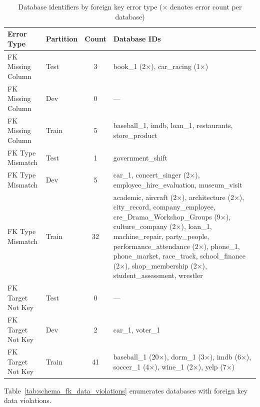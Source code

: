 \documentclass[]{einformatica}
\begin{document}
\begin{table}[ht]
    \caption{Database identifiers by foreign key error type (× denotes error count per database)}
    \label{tab:schema_dbs_by_error}
    \centering
    \footnotesize
    \begin{tabular}{llcp{}}
        \toprule
        \textbf{Error Type} & \textbf{Partition} & \textbf{Count} & \textbf{Database IDs} \\
        \midrule
        FK Missing Column & Test & 3 & book\_1 (2×), car\_racing (1×) \\
        FK Missing Column & Dev & 0 & --- \\
        FK Missing Column & Train & 5 & baseball\_1, imdb, loan\_1, restaurants, store\_product \\
        \midrule
        FK Type Mismatch & Test & 1 & government\_shift \\
        FK Type Mismatch & Dev & 5 & car\_1, concert\_singer (2×), employee\_hire\_evaluation, museum\_visit \\
        FK Type Mismatch & Train & 32 & academic, aircraft (2×), architecture (2×), city\_record, company\_employee, cre\_Drama\_Workshop\_Groups (9×), culture\_company (2×), loan\_1, machine\_repair, party\_people, performance\_attendance (2×), phone\_1, phone\_market, race\_track, school\_finance (2×), shop\_membership (2×), student\_assessment, wrestler \\
        \midrule
        FK Target Not Key & Test & 0 & --- \\
        FK Target Not Key & Dev & 2 & car\_1, voter\_1 \\
        FK Target Not Key & Train & 41 & baseball\_1 (20×), dorm\_1 (3×), imdb (6×), soccer\_1 (4×), wine\_1 (2×), yelp (7×) \\
        \bottomrule
    \end{tabular}
\end{table}

Table~\ref{tab:schema_fk_data_violations} enumerates databases with foreign key data violations.
\end{document}
